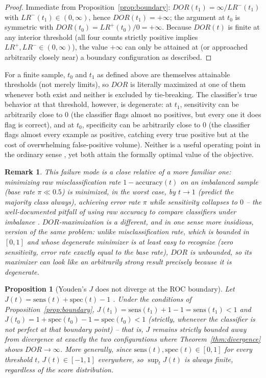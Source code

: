 \documentclass[11pt]{article}
\newtheorem{proposition}{Proposition}
\newtheorem{remark}{Remark}
\begin{document}
\begin{proof}
Immediate from Proposition~\ref{prop:boundary}: $DOR(t_1) = \infty /
LR^-(t_1)$ with $LR^-(t_1) \in (0,\infty)$, hence $DOR(t_1) = +\infty$; the
argument at $t_0$ is symmetric with $DOR(t_0) = LR^+(t_0)/0 = +\infty$.
Because $DOR(t)$ is finite at any interior threshold (all four counts
strictly positive implies $LR^+, LR^- \in (0,\infty)$), the value $+\infty$
can only be attained at (or approached arbitrarily closely near) a boundary
configuration as described.
\end{proof}

For a finite sample, $t_0$ and $t_1$ as defined above are themselves
attainable thresholds (not merely limits), so $DOR$ is literally maximized
at one of them whenever both exist and neither is excluded by tie-breaking.
The classifier's true behavior at that threshold, however, is degenerate:
at $t_1$, sensitivity can be arbitrarily close to $0$ (the classifier flags
almost no positives, but every one it does flag is correct), and at $t_0$,
specificity can be arbitrarily close to $0$ (the classifier flags almost
every example as positive, catching every true positive but at the cost of
overwhelming false-positive volume). Neither is a useful operating point in
the ordinary sense \citep{hosmer2013,pepe2003}, yet both attain the formally
optimal value of the objective.

\begin{remark}
This failure mode is a close relative of a more familiar one: minimizing
raw misclassification rate $1 - \mathrm{accuracy}(t)$ on an imbalanced
sample (base rate $\pi \ll 0.5$) is minimized, in the worst case, by
$t \to 1$ (predict the majority class always), achieving error rate $\pi$
while sensitivity collapses to $0$ -- the well-documented pitfall of using
raw accuracy to compare classifiers under imbalance
\citep{provost1998,he2009,chawla2002}. $DOR$-maximization is a different,
and in one sense more insidious, version of the same problem: unlike
misclassification rate, which is bounded in $[0,1]$ and whose degenerate
minimizer is at least easy to recognize (zero sensitivity, error rate
exactly equal to the base rate), $DOR$ is unbounded, so its maximizer can
look like an arbitrarily strong result precisely because it is degenerate.
\end{remark}

\begin{proposition}[Youden's $J$ does not diverge at the ROC boundary]
\label{prop:youden-bounded}
Let $J(t) = \mathrm{sens}(t) + \mathrm{spec}(t) - 1$ \citep{youden1950}.
Under the conditions of Proposition~\ref{prop:boundary},
$J(t_1) = \mathrm{sens}(t_1) + 1 - 1 = \mathrm{sens}(t_1) < 1$ and
$J(t_0) = 1 + \mathrm{spec}(t_0) - 1 = \mathrm{spec}(t_0) < 1$ (strictly,
whenever the classifier is not perfect at that boundary point) -- that is,
$J$ remains strictly bounded away from divergence at exactly the two
configurations where Theorem~\ref{thm:divergence} shows $DOR \to \infty$.
More generally, since $\mathrm{sens}(t), \mathrm{spec}(t) \in [0,1]$ for
every threshold $t$, $J(t) \in [-1,1]$ everywhere, so $\sup_t J(t)$ is
always finite, regardless of the score distribution.
\end{proposition}
\end{document}
